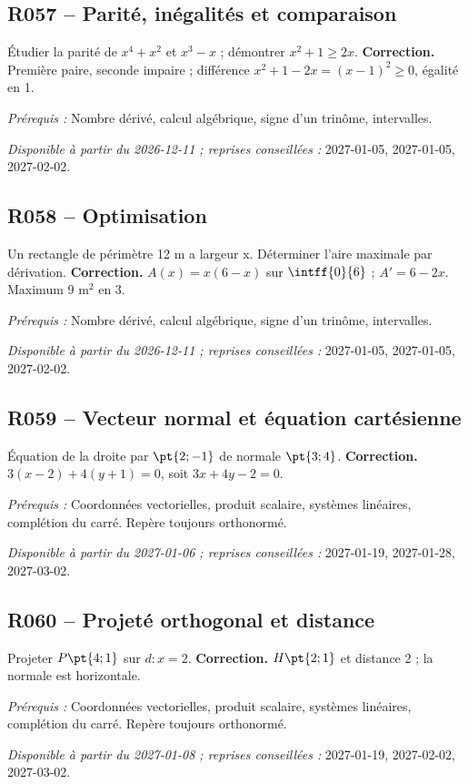 \subsection*{R057 -- Parité, inégalités et comparaison}\label{R057}
Étudier la parité de $x^4+x^2$ et $x^3-x$ ; démontrer $x^2+1\geq2x$.
\ifmxteacher\textbf{Correction.} Première paire, seconde impaire ; différence $x^2+1-2x=(x-1)^2\geq0$, égalité en 1.\par\textit{Prérequis :} Nombre dérivé, calcul algébrique, signe d’un trinôme, intervalles.\par\textit{Disponible à partir du 2026-12-11 ; reprises conseillées :} 2027-01-05, 2027-01-05, 2027-02-02.\fi
{}\subsection*{R058 -- Optimisation}\label{R058}
Un rectangle de périmètre 12 m a largeur x. Déterminer l’aire maximale par dérivation.
\ifmxteacher\textbf{Correction.} $A(x)=x(6-x)$ sur $\intff{0}{6}$ ; $A\prime=6-2x$. Maximum 9 m$^2$ en 3.\par\textit{Prérequis :} Nombre dérivé, calcul algébrique, signe d’un trinôme, intervalles.\par\textit{Disponible à partir du 2026-12-11 ; reprises conseillées :} 2027-01-05, 2027-01-05, 2027-02-02.\fi
{}\subsection*{R059 -- Vecteur normal et équation cartésienne}\label{R059}
Équation de la droite par $\pt{2;-1}$ de normale $\pt{3;4}$.
\ifmxteacher\textbf{Correction.} $3(x-2)+4(y+1)=0$, soit $3x+4y-2=0$.\par\textit{Prérequis :} Coordonnées vectorielles, produit scalaire, systèmes linéaires, complétion du carré. Repère toujours orthonormé.\par\textit{Disponible à partir du 2027-01-06 ; reprises conseillées :} 2027-01-19, 2027-01-28, 2027-03-02.\fi
{}\subsection*{R060 -- Projeté orthogonal et distance}\label{R060}
Projeter $P\pt{4;1}$ sur $d:x=2$.
\ifmxteacher\textbf{Correction.} $H\pt{2;1}$ et distance 2 ; la normale est horizontale.\par\textit{Prérequis :} Coordonnées vectorielles, produit scalaire, systèmes linéaires, complétion du carré. Repère toujours orthonormé.\par\textit{Disponible à partir du 2027-01-08 ; reprises conseillées :} 2027-01-19, 2027-02-02, 2027-03-02.\fi
